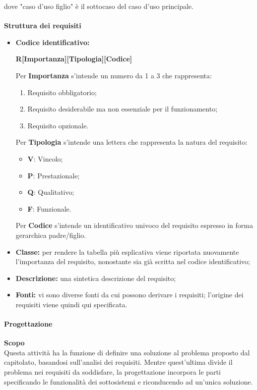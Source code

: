 dove "caso d'uso figlio" è il sottocaso del caso d'uso principale. \\ \mbox{} \\
\textbf{Struttura dei requisiti} \label{para:requisiti}
\begin{itemize}
\item \textbf{Codice identificativo:} 
\begin{center}
\textbf{R[Importanza][Tipologia][Codice]}
\end{center}
 		
Per \textbf{Importanza} s'intende un numero da 1 a 3 che rappresenta:
\begin{enumerate}
\item Requisito obbligatorio;
\item Requisito desiderabile ma non essenziale per il funzionamento;
\item Requisito opzionale.
\end{enumerate}
Per \textbf{Tipologia} s'intende una lettera che rappresenta la natura del requisito:
\begin{itemize}
\item \textbf{V}: Vincolo;
\item \textbf{P}: Prestazionale;
\item \textbf{Q}: Qualitativo;
\item \textbf{F}: Funzionale.
\end{itemize}

Per \textbf{Codice} s'intende un identificativo univoco del requisito espresso in forma gerarchica padre/figlio.
\item \textbf{Classe:} per rendere la tabella più esplicativa viene riportata nuovamente l'importanza del requisito, nonostante sia già scritta nel codice identificativo;
\item \textbf{Descrizione:} una sintetica descrizione del requisito;
\item \textbf{Fonti:} vi sono diverse fonti da cui possono derivare i requisiti; l'origine dei requisiti viene quindi qui specificata. 
\end{itemize}

\paragraph{Progettazione}
\textbf{Scopo} \mbox{} \\
Questa attività ha la funzione di definire una soluzione al problema proposto dal capitolato, basandosi sull'analisi dei requisiti.
Mentre quest'ultima divide il problema nei requisiti da soddisfare, la progettazione incorpora le parti specificando le funzionalità dei sottosistemi e riconducendo ad un'unica soluzione. \\ 


